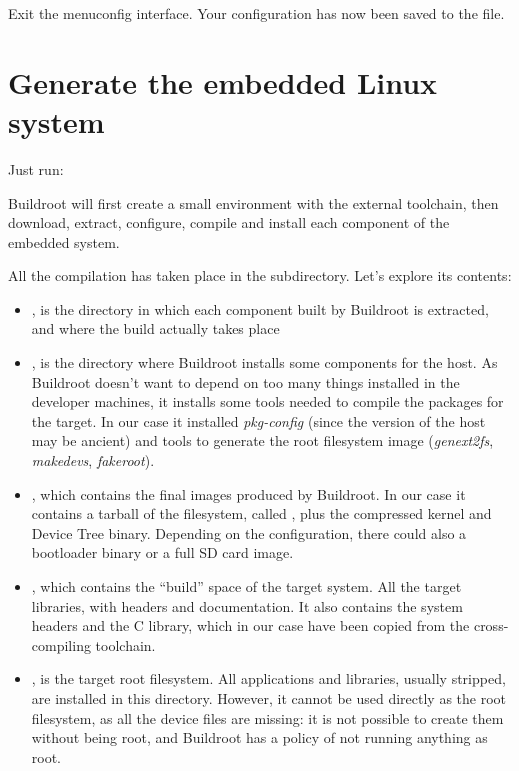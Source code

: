 Exit the menuconfig interface. Your configuration has now been saved
to the  file.

\section{Generate the embedded Linux system}

Just run:


Buildroot will first create a small environment with the external
toolchain, then download, extract, configure, compile and install each
component of the embedded system.

All the compilation has taken place in the  subdirectory. Let's
explore its contents:

\begin{itemize}

\item {}, is the directory in which each component built by
  Buildroot is extracted, and where the build actually takes place

\item {}, is the directory where Buildroot installs some
  components for the host. As Buildroot doesn't want to depend on too
  many things installed in the developer machines, it installs some
  tools needed to compile the packages for the target. In our case it
  installed {\em pkg-config} (since the version of the host may be ancient)
  and tools to generate the root filesystem image ({\em genext2fs},
  {\em makedevs}, {\em fakeroot}).

\item {}, which contains the final images produced by
  Buildroot. In our case it contains a tarball of the filesystem, called
  , plus the compressed kernel and Device Tree binary.
  Depending on the configuration, there could also a bootloader binary
  or a full SD card image.

\item {}, which contains the “build” space of the target
  system. All the target libraries, with headers and documentation. It
  also contains the system headers and the C library, which in our
  case have been copied from the cross-compiling toolchain.

\item {}, is the target root filesystem. All applications
  and libraries, usually stripped, are installed in this
  directory. However, it cannot be used directly as the root
  filesystem, as all the device files are missing: it is not possible
  to create them without being root, and Buildroot has a policy of not
  running anything as root.

\end{itemize}

